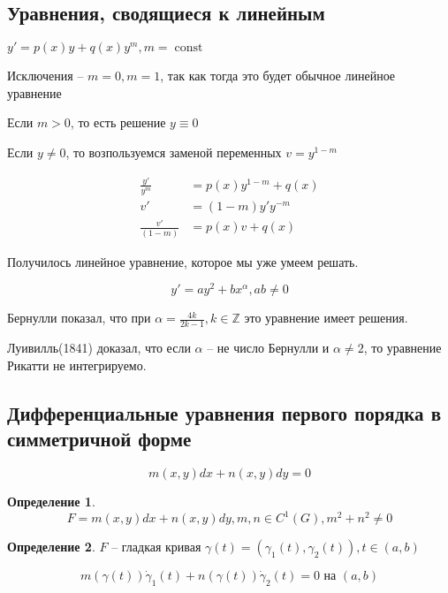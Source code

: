 \documentclass[a4paper]{article}
\theoremstyle{indented}
\theoremstyle{definition}
\newtheorem*{defn}{Определение}
\theoremstyle{remark}
\DeclareMathOperator{\const}{const}
\begin{document}
\subsection{Уравнения, сводящиеся к линейным}

 $y' = p(x)y + q(x) y^m, m = \const$

Исключения -- $m = 0, m = 1$, так как тогда это будет обычное линейное уравнение

Если $m > 0$, то есть решение $y \equiv 0$

Если $y \neq 0$, то возпользуемся заменой переменных
$v = y^{1-m}$

\begin{equation*}
  \begin{aligned}
    \frac{y'}{y^m}& = p(x) y^{1-m} + q(x)\\
    v'& = (1-m) y' y^{-m} \\
    \frac{v'}{(1-m)} & = p(x) v + q(x)
  \end{aligned}
\end{equation*}

Получилось линейное уравнение, которое мы уже умеем решать.

\[y' = ay^2 + bx^{\alpha}, ab \neq 0 \]

Бернулли показал, что при $\alpha = \frac{4k}{2k-1}, k \in \mathbb{Z}$ это уравнение имеет решения.

Луивилль(1841) доказал, что если $\alpha$ -- не число Бернулли и $\alpha \neq 2$, то уравнение Рикатти не интегрируемо.

\subsection{Дифференциальные уравнения первого порядка в симметричной форме}

\[m(x,y) dx + n(x,y) dy = 0\]

\begin{defn}

  \[F = m(x,y) dx + n(x,y) dy, m,n \in C^1(G), m^2 + n^2 \neq 0\]

\end{defn}

\begin{defn}
   $F$ -- гладкая кривая $\gamma(t) = (\gamma_1(t), \gamma_2(t)), t \in (a,b)$

  \[m(\gamma(t)) \dot \gamma_1(t) + n(\gamma(t)) \dot \gamma_2(t) = 0 \text{ на } (a,b)
  \]
\end{defn}
\end{document}
